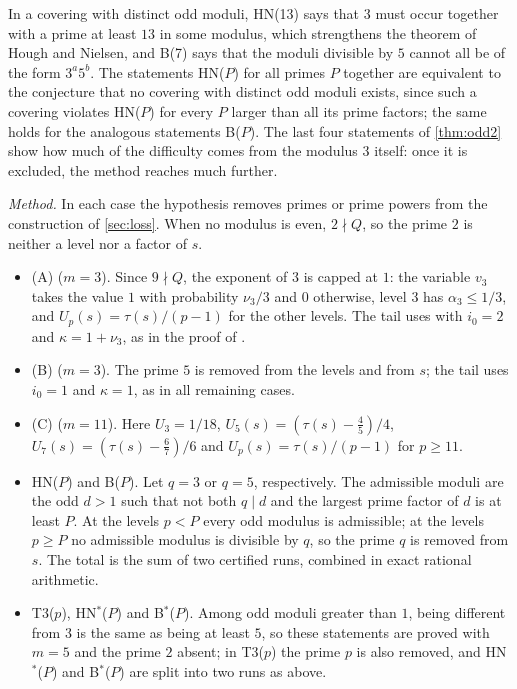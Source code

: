 In a covering with distinct odd moduli, HN(13) says that $3$ must occur together with a prime at least $13$ in some
modulus, which strengthens the theorem of Hough and Nielsen, and B(7) says that the moduli divisible by $5$ cannot all
be of the form $3^a5^b$. The statements HN($P$) for all primes $P$ together are equivalent to the conjecture that no
covering with distinct odd moduli exists, since such a covering violates HN($P$) for every $P$ larger than all its prime
factors; the same holds for the analogous statements B($P$). The last four statements of \cref{thm:odd2} show how much
of the difficulty comes from the modulus $3$ itself: once it is excluded, the method reaches much further.

\emph{Method.} In each case the hypothesis removes primes or prime powers from the construction of
\cref{sec:loss}. When no modulus is even, $2\nmid Q$, so the prime $2$ is neither a level nor a factor of $s$.
\begin{itemize}
\item (A) ($m=3$). Since $9\nmid Q$, the exponent of $3$ is capped at $1$: the variable $v_3$ takes the value $1$
  with probability $\nu_3/3$ and $0$ otherwise, level $3$ has $\alpha_3\le1/3$, and $U_p(s)=\tau(s)/(p-1)$ for the
  other levels. The tail uses \cite[Theorem~6.1]{BBMST} with $i_0=2$ and $\kappa=1+\nu_3$, as in the proof of
  \cite[Theorem~1.4]{BBMST}.
\item (B) ($m=3$). The prime $5$ is removed from the levels and from $s$; the tail uses $i_0=1$ and $\kappa=1$, as in
  all remaining cases.
\item (C) ($m=11$). Here $U_3=1/18$, $U_5(s)=(\tau(s)-\frac45)/4$, $U_7(s)=(\tau(s)-\frac67)/6$ and
  $U_p(s)=\tau(s)/(p-1)$ for $p\ge11$.
\item HN($P$) and B($P$). Let $q=3$ or $q=5$, respectively. The admissible moduli are the odd $d>1$ such that not both
  $q\mid d$ and the largest prime factor of $d$ is at least $P$. At the levels $p<P$ every odd modulus is admissible;
  at the levels $p\ge P$ no admissible modulus is divisible by $q$, so the prime $q$ is removed from $s$. The total is
  the sum of two certified runs, combined in exact rational arithmetic.
\item T3($p$), HN$^*$($P$) and B$^*$($P$). Among odd moduli greater than $1$, being different from $3$ is the same as
  being at least $5$, so these statements are proved with $m=5$ and the prime $2$ absent; in T3($p$) the prime $p$ is
  also removed, and HN$^*$($P$) and B$^*$($P$) are split into two runs as above.
\end{itemize}

